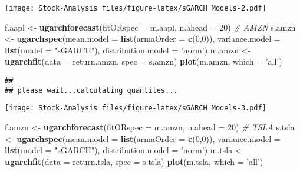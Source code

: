 \documentclass[
]{article}
\newenvironment{Shaded}{\begin{snugshade}}{\end{snugshade}}
\newcommand{\CommentTok}[1]{\textcolor[rgb]{0.56,0.35,0.01}{\textit{#1}}}
\newcommand{\DataTypeTok}[1]{\textcolor[rgb]{0.13,0.29,0.53}{#1}}
\newcommand{\DecValTok}[1]{\textcolor[rgb]{0.00,0.00,0.81}{#1}}
\newcommand{\KeywordTok}[1]{\textcolor[rgb]{0.13,0.29,0.53}{\textbf{#1}}}
\newcommand{\NormalTok}[1]{#1}
\newcommand{\StringTok}[1]{\textcolor[rgb]{0.31,0.60,0.02}{#1}}
\begin{document}
\texttt{[image: Stock-Analysis\_files/figure-latex/sGARCH Models-2.pdf]}

\begin{Shaded}
\begin{Highlighting}[]
\NormalTok{f.aapl <-}\StringTok{ }\KeywordTok{ugarchforecast}\NormalTok{(}\DataTypeTok{fitORspec =}\NormalTok{ m.aapl,}
                    \DataTypeTok{n.ahead =} \DecValTok{20}\NormalTok{)}
\CommentTok{# AMZN}
\NormalTok{s.amzn <-}\StringTok{ }\KeywordTok{ugarchspec}\NormalTok{(}\DataTypeTok{mean.model =} \KeywordTok{list}\NormalTok{(}\DataTypeTok{armaOrder =} \KeywordTok{c}\NormalTok{(}\DecValTok{0}\NormalTok{,}\DecValTok{0}\NormalTok{)),}
                \DataTypeTok{variance.model =} \KeywordTok{list}\NormalTok{(}\DataTypeTok{model =} \StringTok{"sGARCH"}\NormalTok{),}
                \DataTypeTok{distribution.model =} \StringTok{'norm'}\NormalTok{)}
\NormalTok{m.amzn <-}\StringTok{ }\KeywordTok{ugarchfit}\NormalTok{(}\DataTypeTok{data =}\NormalTok{ return.amzn, }\DataTypeTok{spec =}\NormalTok{ s.amzn)}
\KeywordTok{plot}\NormalTok{(m.amzn, }\DataTypeTok{which =} \StringTok{'all'}\NormalTok{)}
\end{Highlighting}
\end{Shaded}

\begin{verbatim}
## 
## please wait...calculating quantiles...
\end{verbatim}

\texttt{[image: Stock-Analysis\_files/figure-latex/sGARCH Models-3.pdf]}

\begin{Shaded}
\begin{Highlighting}[]
\NormalTok{f.amzn <-}\StringTok{ }\KeywordTok{ugarchforecast}\NormalTok{(}\DataTypeTok{fitORspec =}\NormalTok{ m.amzn,}
                    \DataTypeTok{n.ahead =} \DecValTok{20}\NormalTok{)}
\CommentTok{# TSLA}
\NormalTok{s.tsla <-}\StringTok{ }\KeywordTok{ugarchspec}\NormalTok{(}\DataTypeTok{mean.model =} \KeywordTok{list}\NormalTok{(}\DataTypeTok{armaOrder =} \KeywordTok{c}\NormalTok{(}\DecValTok{0}\NormalTok{,}\DecValTok{0}\NormalTok{)),}
                \DataTypeTok{variance.model =} \KeywordTok{list}\NormalTok{(}\DataTypeTok{model =} \StringTok{"sGARCH"}\NormalTok{),}
                \DataTypeTok{distribution.model =} \StringTok{'norm'}\NormalTok{)}
\NormalTok{m.tsla <-}\StringTok{ }\KeywordTok{ugarchfit}\NormalTok{(}\DataTypeTok{data =}\NormalTok{ return.tsla, }\DataTypeTok{spec =}\NormalTok{ s.tsla)}
\KeywordTok{plot}\NormalTok{(m.tsla, }\DataTypeTok{which =} \StringTok{'all'}\NormalTok{)}
\end{Highlighting}
\end{Shaded}
\end{document}
